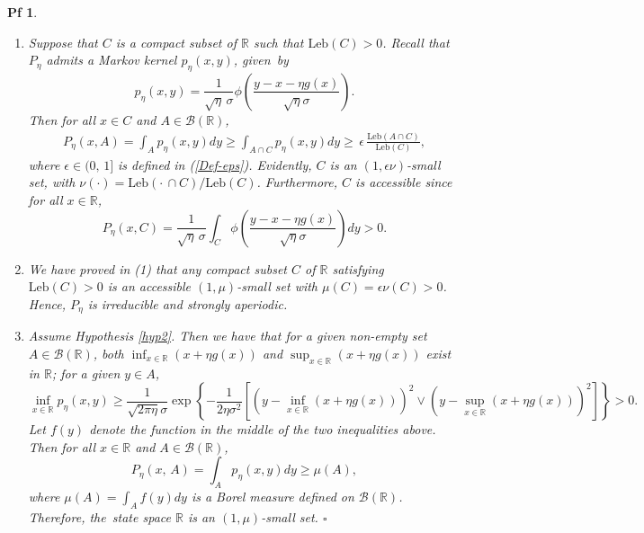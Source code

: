 \documentclass[10pt,a4paper]{amsart}
\newtheorem{pf}{Pf}
\def\R{\mathbb{R}}
\def\geq{\geqslant}
\begin{document}
\begin{pf}
	\begin{enumerate}
	\item[(1)] 	Suppose that $C$ is a compact subset of $\mathbb{R}$ such that $\mbox{Leb}(C)>0$. Recall that $P_{\eta}$ admits a Markov kernel $p_{\eta}(x,y)$, given~by
	$$p_{\eta}(x,y)=\frac{1}{\sqrt{\eta}\,\sigma}\phi\left(\frac{y-x-\eta g(x)}{\sqrt{\eta}\sigma} \right).$$
	Then for all $x\in C$ and $A\in\mathcal{B}(\R)$,		
	\begin{align*}
			P_{\eta}(x,A)=\int_A p_{\eta}(x,y) dy\geq\int_{A\cap C}p_{\eta}(x,y) dy\geq\,\epsilon\, \frac{\mbox{Leb}(A\cap C)}{\mbox{Leb}(C)},
	\end{align*}
	where $\epsilon\in(0,\,1]$ is defined in (\ref{Def-eps}). Evidently, $C$ is an $(1,\epsilon\nu)$-small set, with $\nu(\cdot)=\mbox{Leb}(\cdot\,\cap C)/\mbox{Leb}(C)$. Furthermore, $C$ is accessible since for all $x\in\R$,
	$$P_{\eta}(x,C)=\frac{1}{\sqrt{\eta}\,\sigma}\int_C\phi\left(\frac{y-x-\eta g(x)}{\sqrt{\eta}\sigma}\right)dy>0.$$
	\item[(2)] We have proved in (1) that any compact subset $C$ of $\R$ satisfying $\mbox{Leb}(C)>0$ is an accessible $(1,\mu)$-small set with $\mu(C)=\epsilon\nu(C)>0$. Hence, $P_{\eta}$ is irreducible and strongly aperiodic.
	\item[(3)] Assume Hypothesis \ref{hyp2}. Then we have that for a given non-empty set $A\in\mathcal{B}(\R)$, both $\inf_{x\in\R}(x+\eta g(x))$ and $\sup_{x\in\R}(x+\eta g(x))$ exist in $\R$; for a given $y\in A$,	
		$$
		\inf_{x\in\R}p_{\eta}(x,y)\geq\frac{1}{\sqrt{2\pi\eta}\sigma}\exp\left\{-\frac{1}{2\eta\sigma^2}\left[\left(y-\inf_{x\in\R}(x+\eta g(x))\right)^2\vee\left(y-\sup_{x\in\R}(x+\eta g(x))\right)^2\right]\right\}>0.
		$$
      Let $f(y)$ denote the function in the middle of the two inequalities above. Then for all $x\in\R$ and $A\in\mathcal{B}(\R)$,
      $$P_{\eta}(x,\,A)=\int_A p_{\eta}(x,y) dy\geq\mu(A),$$
      where $\mu(A)=\int_A f(y) dy$ is a Borel measure defined on $\mathcal{B}(\R)$. Therefore, the~state space $\R$ is an $(1,\mu)$-small set. \hfill$\square$
\end{enumerate}
\end{pf}
\end{document}
